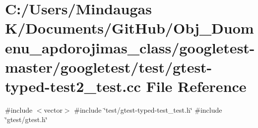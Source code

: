 \hypertarget{googletest-master_2googletest_2test_2gtest-typed-test2__test_8cc}{}\section{C\+:/\+Users/\+Mindaugas K/\+Documents/\+Git\+Hub/\+Obj\+\_\+\+Duomenu\+\_\+apdorojimas\+\_\+class/googletest-\/master/googletest/test/gtest-\/typed-\/test2\+\_\+test.cc File Reference}
\label{googletest-master_2googletest_2test_2gtest-typed-test2__test_8cc}
{\ttfamily \#include $<$vector$>$}\newline
{\ttfamily \#include \char`\"{}test/gtest-\/typed-\/test\+\_\+test.\+h\char`\"{}}\newline
{\ttfamily \#include \char`\"{}gtest/gtest.\+h\char`\"{}}\newline
